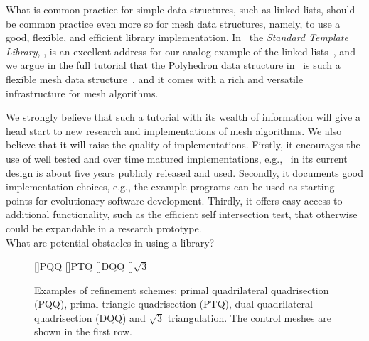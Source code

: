 \documentclass[twocolumn]{article}
\begin{document}
What is common practice for simple data structures, such as linked
lists, should be common practice even more so for mesh data
structures, namely, to use a good, flexible, and efficient library
implementation. In \CC\, the \emph{Standard Template Library}, \stl,
is an excellent address for our analog example of the linked
lists~\cite{Austern:1999:GPS}, and we argue in the full tutorial that
the Polyhedron data structure in \cgal\ is such a flexible mesh data
structure~\cite{k-ugpdd-99}, and it comes with a rich and versatile
infrastructure for mesh algorithms.

We strongly believe that such a tutorial with its wealth of
information will give a head start to new research and implementations
of mesh algorithms. We also believe that it will raise the quality of
implementations. Firstly, it encourages the use of well tested and
over time matured implementations, e.g., \cgalpoly\ in its current
design is about five years publicly released and used. Secondly, it
documents good implementation choices, e.g., the example programs can
be used as starting points for evolutionary software development.
Thirdly, it offers easy access to additional functionality, such as
the efficient self intersection test, that otherwise could be
expandable in a research prototype.\\

\noindent
What are potential obstacles in using a library?

\begin{figure}[tb]
  \centering
  []{\scriptsize PQQ} 
  []{\scriptsize PTQ}
  []{\scriptsize DQQ} 
  []{\scriptsize $\sqrt{3}$} 
  \caption{Examples of refinement schemes: 
    primal quadrilateral quadrisection (PQQ),
    primal triangle quadrisection (PTQ),
    dual quadrilateral quadrisection (DQQ) and
    $\sqrt{3}$ triangulation. The control meshes are shown
    in the first row.}
  \label{fig:RefSchemes}
\end{figure}
\end{document}
